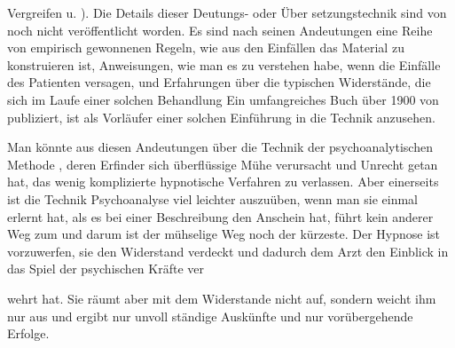 \documentclass[twoside=true,titlepage=false,open=any, parskip=never, fontsize=10pt, headings=small, chapterprefix=false, appendixprefix=false]{scrbook}
\begin{document}
Vergreifen u. ). Die Details dieser Deutungs- oder Über
setzungstechnik sind
               von  noch nicht veröffentlicht worden.
 Es sind nach seinen Andeutungen eine Reihe von
               empirisch
 gewonnenen Regeln, wie aus den Einfällen das  Material
 zu konstruieren ist, Anweisungen, wie man es zu verstehen
               habe,
 wenn die Einfälle des Patienten versagen, und Erfahrungen über
 die  typischen Widerstände, die sich im Laufe einer
 solchen Behandlung  Ein umfangreiches Buch über
 1900 von  publiziert, ist als
               Vorläufer
 einer solchen Einführung in die Technik anzusehen.
        \pend
    

        \pstart
        Man könnte aus diesen Andeutungen über die Technik der
 psychoanalytischen
               Methode , deren Erfinder sich
 überflüssige Mühe verursacht und Unrecht getan hat,
               das wenig
 komplizierte hypnotische Verfahren zu verlassen. Aber einerseits
               ist die Technik  Psychoanalyse viel leichter auszuüben, wenn
 man sie einmal erlernt hat,
               als es bei einer Beschreibung den
 Anschein hat,  führt kein anderer Weg zum  und
 darum ist der mühselige Weg noch der kürzeste. Der Hypnose
 ist
               vorzuwerfen,  sie den Widerstand verdeckt und dadurch
 dem Arzt den Einblick in das
               Spiel der psychischen Kräfte ver

wehrt hat. Sie räumt aber mit dem Widerstande nicht auf,
 sondern weicht
               ihm nur aus und ergibt  nur unvoll
ständige Auskünfte und nur vorübergehende
               Erfolge.
        \pend
    
\end{document}
